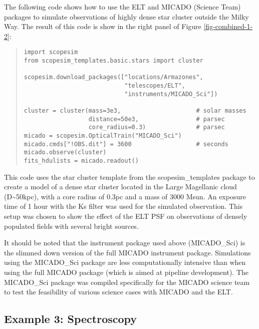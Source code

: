 The following code shows how to use the ELT and MICADO (Science Team) packages to simulate observations of highly dense star cluster outside the Milky Way.
The result of this code is show in the right panel of Figure \ref{fig-combined-1-2}:

\begin{quote}
\begin{alltt}
\begin{lstlisting}[frame=single]
import scopesim
from scopesim_templates.basic.stars import cluster

scopesim.download_packages(["locations/Armazones",
                            "telescopes/ELT",
                            "instruments/MICADO_Sci"])

cluster = cluster(mass=3e3,                     # solar masses
                  distance=50e3,                # parsec
                  core_radius=0.3)              # parsec
micado = scopesim.OpticalTrain("MICADO_Sci")
micado.cmds["!OBS.dit"] = 3600                  # seconds
micado.observe(cluster)
fits_hdulists = micado.readout()
\end{lstlisting}
\end{alltt}
\end{quote}

This code uses the star cluster template from the scopesim\_templates package to create a model of a dense star cluster located in the Large Magellanic cloud (D\textasciitilde{}50kpc), with a core radius of 0.3pc and a mass of 3000 Msun.
An exposure time of 1 hour with the Ks filter was used for the simulated observation.
This setup was chosen to show the effect of the ELT PSF on observations of densely populated fields with several bright sources.

It should be noted that the instrument package used above (MICADO\_Sci) is the slimmed down version of the full MICADO instrument package.
Simulations using the MICADO\_Sci package are less computationally intensive than when using the full MICADO package (which is aimed at pipeline development).
The MICADO\_Sci package was compiled specifically for the MICADO science team to test the feasibility of various science cases with MICADO and the ELT.


\subsection{Example 3: Spectroscopy%
  \label{example-3-spectroscopy}%
}


